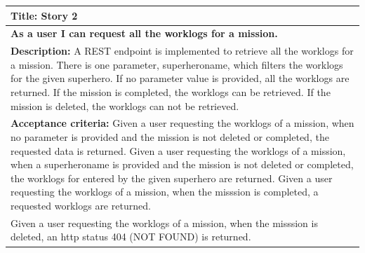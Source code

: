 \begin{oefening}
\begin{tabularx}{\textwidth}{| X |}
\hline
\textbf{Title:} Story 2\\
\hline
\textbf{As a user I can request all the worklogs for a mission.}\\
\hline
\textbf{Description:} A REST endpoint is implemented to retrieve all the worklogs for a mission. There is one parameter, superheroname, which filters the worklogs for the given superhero. If no parameter value is provided, all the worklogs are returned. If the mission is completed, the worklogs can be retrieved.  If the mission is deleted, the worklogs can not be retrieved.  \\
\hline
\textbf{Acceptance criteria:}
Given a user requesting the worklogs of a mission,\newline
when no parameter is provided and the mission is not deleted or completed,\newline
the requested data is returned. \newline
Given a user requesting the worklogs of a mission, \newline
when a superheroname is provided and the mission is not deleted or completed,\newline
the worklogs for entered by the given superhero are returned.\newline
Given a user requesting the worklogs of a mission, \newline
when the misssion is completed,\newline
a requested worklogs are returned.\\
Given a user requesting the worklogs of a mission, \newline
when the misssion is deleted,\newline
an http status 404 (NOT FOUND) is returned.\\
\hline
\end{tabularx}

\end{oefening}